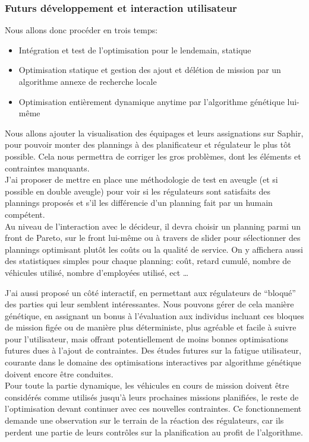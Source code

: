 \documentclass[french, 11pt]{memoir}
\begin{document}
\subsubsection{Futurs développement et interaction
utilisateur}\label{futurs-duxe9veloppement-et-interaction-utilisateur}

Nous allons donc procéder en trois temps:
\begin{itemize}
\item
  Intégration et test de l'optimisation pour le lendemain, statique
\item
  Optimisation statique et gestion des ajout et délétion de mission par
  un algorithme annexe de recherche locale
\item
  Optimisation entièrement dynamique anytime par l'algorithme génétique
  lui-même
\end{itemize}

\bigskip
Nous allons ajouter la visualisation des équipages et leurs assignations
sur Saphir, pour pouvoir monter des plannings à des planificateur et
régulateur le plus tôt possible. Cela nous permettra de corriger les
gros problèmes, dont les éléments et contraintes manquants. \\
J'ai proposer de mettre en place une méthodologie de test en aveugle (et
si possible en double aveugle) pour voir si les régulateurs sont
satisfaits des plannings proposés et s'il les différencie d'un planning
fait par un humain compétent. \\
Au niveau de l'interaction avec le décideur, il devra choisir un
planning parmi un front de Pareto, sur le front lui-même ou à travers de
slider pour sélectionner des plannings optimisant plutôt les coûts ou la
qualité de service. On y affichera aussi des statistiques simples pour
chaque planning: coût, retard cumulé, nombre de véhicules utilisé,
nombre d'employées utilisé, ect \ldots{}

\bigskip
J'ai aussi proposé un côté interactif, en permettant aux régulateurs de
``bloqué'' des parties qui leur semblent intéressantes. Nous pouvons
gérer de cela manière génétique, en assignant un bonus à l'évaluation
aux individus incluant ces bloques de mission figée ou de manière plus
déterministe, plus agréable et facile à suivre pour l'utilisateur, mais
offrant potentiellement de moins bonnes optimisations futures dues à
l'ajout de contraintes. Des études futures sur la fatigue utilisateur,
courante dans le domaine des optimisations interactives\cite{cho2002towards} par algorithme
génétique doivent encore être conduites. \\
Pour toute la partie dynamique, les véhicules en cours de mission
doivent être considérés comme utilisés jusqu'à leurs prochaines missions
planifiées, le reste de l'optimisation devant continuer avec ces
nouvelles contraintes. Ce fonctionnement demande une observation sur le
terrain de la réaction des régulateurs, car ils perdent une partie de
leurs contrôles sur la planification au profit de l'algorithme.
\end{document}
